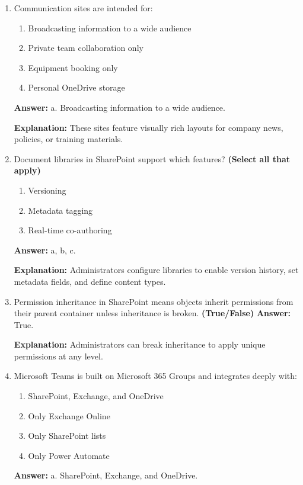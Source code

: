 \documentclass[10pt]{article}
\begin{document}
\begin{enumerate}[leftmargin=*]
\textbf{Explanation:} When a team site is created, it provisions a shared document library, group mailbox, and calendar.

\item Communication sites are intended for:
\begin{enumerate}[label=\alph*., leftmargin=1.5em]
\item Broadcasting information to a wide audience
\item Private team collaboration only
\item Equipment booking only
\item Personal OneDrive storage
\end{enumerate}
\textbf{Answer:} a. Broadcasting information to a wide audience.

\textbf{Explanation:} These sites feature visually rich layouts for company news, policies, or training materials.

\item Document libraries in SharePoint support which features? \textbf{(Select all that apply)}
\begin{enumerate}[label=\alph*., leftmargin=1.5em]
\item Versioning
\item Metadata tagging
\item Real-time co-authoring
\end{enumerate}
\textbf{Answer:} a, b, c.

\textbf{Explanation:} Administrators configure libraries to enable version history, set metadata fields, and define content types.

\item Permission inheritance in SharePoint means objects inherit permissions from their parent container unless inheritance is broken. \textbf{(True/False)}
\textbf{Answer:} True.

\textbf{Explanation:} Administrators can break inheritance to apply unique permissions at any level.

\item Microsoft Teams is built on Microsoft 365 Groups and integrates deeply with:
\begin{enumerate}[label=\alph*., leftmargin=1.5em]
\item SharePoint, Exchange, and OneDrive
\item Only Exchange Online
\item Only SharePoint lists
\item Only Power Automate
\end{enumerate}
\textbf{Answer:} a. SharePoint, Exchange, and OneDrive.


\end{enumerate}
\end{document}
